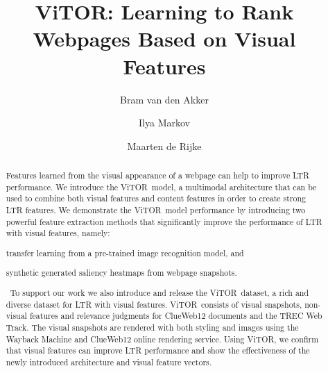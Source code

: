 \documentclass[sigconf,screen=true,anonymous]{acmart}
\title{ViTOR: Learning to Rank Webpages Based on Visual Features}
\author{Bram van den Akker}
\affiliation{%
  \institution{University of Amsterdam}
  \city{Amsterdam} 
  \country{The Netherlands}
}
\author{Ilya Markov}
\affiliation{%
  \institution{University of Amsterdam}
  \city{Amsterdam} 
  \country{The Netherlands}  
}
\author{Maarten de Rijke}
\affiliation{%
   \institution{University of Amsterdam}
   \city{Amsterdam} 
   \country{The Netherlands}
}
\newcommand{\datasetname}{\ac{ViTOR}}
\newcommand{\modelname}{\ac{ViTOR}}
\begin{document}
%
%
\begin{abstract}
Features learned from the visual appearance of a webpage can help to improve \ac{LTR} performance. 
We introduce the \modelname~model, a multimodal architecture that can be used to combine both visual features and content features in order to create strong \ac{LTR} features. 
We demonstrate the \modelname~model performance by introducing two powerful feature extraction methods that significantly improve the performance of \ac{LTR} with visual features, namely: 
\begin{inparaenum}[(i)]
\item transfer learning from a pre-trained image recognition model, and
\item synthetic generated saliency heatmaps from webpage snapshots.
\end{inparaenum}\ 
To support our work we also introduce and release the \datasetname~dataset, a rich and diverse dataset for \ac{LTR} with visual features.
\datasetname~consists of visual snapshots, non-visual features and relevance judgments for ClueWeb12 documents and the TREC Web Track.
The visual snapshots are rendered with both styling and images using the Wayback Machine and ClueWeb12 online rendering service.
Using \datasetname, we confirm that visual features can improve \ac{LTR} performance
and show the effectiveness of the newly introduced architecture and visual feature vectors.
\end{abstract}

%
%
\end{document}
